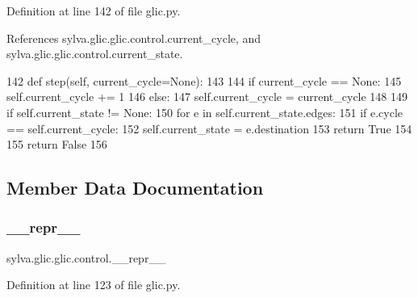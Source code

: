 Definition at line 142 of file glic.\+py.



References sylva.\+glic.\+glic.\+control.\+current\+\_\+cycle, and sylva.\+glic.\+glic.\+control.\+current\+\_\+state.


\begin{DoxyCode}
142         \textcolor{keyword}{def }step(self, current\_cycle=None):
143 
144             \textcolor{keywordflow}{if} current\_cycle == \textcolor{keywordtype}{None}:
145                 self.current\_cycle += 1
146             \textcolor{keywordflow}{else}:
147                 self.current\_cycle = current\_cycle
148 
149             \textcolor{keywordflow}{if} self.current\_state != \textcolor{keywordtype}{None}:
150                 \textcolor{keywordflow}{for} e \textcolor{keywordflow}{in} self.current\_state.edges:
151                     \textcolor{keywordflow}{if} e.cycle == self.current\_cycle:
152                         self.current\_state = e.destination
153                         \textcolor{keywordflow}{return} \textcolor{keyword}{True}
154 
155             \textcolor{keywordflow}{return} \textcolor{keyword}{False}
156 
\end{DoxyCode}


\subsection{Member Data Documentation}
\mbox{\label{classsylva_1_1glic_1_1glic_1_1control_ac4ec61e55ba16dd0abcd97a493be8f0d}} 
\subsubsection{\texorpdfstring{\+\_\+\+\_\+repr\+\_\+\+\_\+}{\_\_repr\_\_}}
{\footnotesize\ttfamily sylva.\+glic.\+glic.\+control.\+\_\+\+\_\+repr\+\_\+\+\_\+\hspace{0.3cm}{\ttfamily [private]}}



Definition at line 123 of file glic.\+py.

\mbox{\label{classsylva_1_1glic_1_1glic_1_1control_a1e5f2d48e2bfafe60f1891e0dcb1d98a}} 
